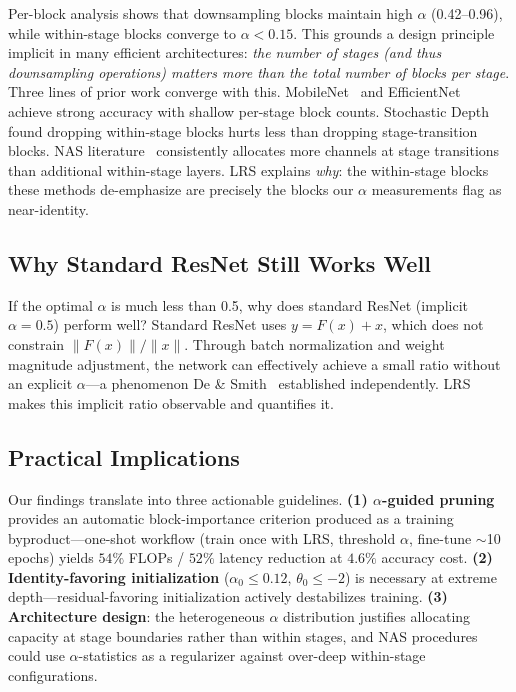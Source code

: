 \documentclass{bmvc2k}
\begin{document}
Per-block analysis shows that downsampling blocks maintain high $\alpha$ (0.42--0.96), while within-stage blocks converge to $\alpha < 0.15$. This grounds a design principle implicit in many efficient architectures: \emph{the number of stages (and thus downsampling operations) matters more than the total number of blocks per stage}. Three lines of prior work converge with this. MobileNet~\cite{howard2017mobilenets} and EfficientNet~\cite{tan2019efficientnet} achieve strong accuracy with shallow per-stage block counts. Stochastic Depth~\cite{huang2016deep} found dropping within-stage blocks hurts less than dropping stage-transition blocks. NAS literature~\cite{tan2019efficientnet} consistently allocates more channels at stage transitions than additional within-stage layers. LRS explains \emph{why}: the within-stage blocks these methods de-emphasize are precisely the blocks our $\alpha$ measurements flag as near-identity.

\subsection{Why Standard ResNet Still Works Well}

If the optimal $\alpha$ is much less than 0.5, why does standard ResNet (implicit $\alpha = 0.5$) perform well? Standard ResNet uses $y = F(x) + x$, which does not constrain $\|F(x)\|/\|x\|$. Through batch normalization and weight magnitude adjustment, the network can effectively achieve a small ratio without an explicit $\alpha$---a phenomenon De \& Smith~\cite{de2020batch} established independently. LRS makes this implicit ratio observable and quantifies it.

\subsection{Practical Implications}
\label{sec:practical_implications}

Our findings translate into three actionable guidelines. \textbf{(1) $\alpha$-guided pruning} provides an automatic block-importance criterion produced as a training byproduct---one-shot workflow (train once with LRS, threshold $\alpha$, fine-tune $\sim$10 epochs) yields $54\%$ FLOPs / $52\%$ latency reduction at $4.6\%$ accuracy cost. \textbf{(2) Identity-favoring initialization} ($\alpha_0 \leq 0.12$, $\theta_0 \leq -2$) is necessary at extreme depth---residual-favoring initialization actively destabilizes training. \textbf{(3) Architecture design}: the heterogeneous $\alpha$ distribution justifies allocating capacity at stage boundaries rather than within stages, and NAS procedures could use $\alpha$-statistics as a regularizer against over-deep within-stage configurations.
\end{document}
